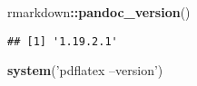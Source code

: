 \documentclass[]{article}
\newenvironment{Shaded}{\begin{snugshade}}{\end{snugshade}}
\newcommand{\KeywordTok}[1]{\textcolor[rgb]{0.13,0.29,0.53}{\textbf{#1}}}
\newcommand{\StringTok}[1]{\textcolor[rgb]{0.31,0.60,0.02}{#1}}
\newcommand{\OperatorTok}[1]{\textcolor[rgb]{0.81,0.36,0.00}{\textbf{#1}}}
\newcommand{\NormalTok}[1]{#1}
\begin{document}
\begin{Shaded}
\begin{Highlighting}[]
\NormalTok{rmarkdown}\OperatorTok{::}\KeywordTok{pandoc_version}\NormalTok{()}
\end{Highlighting}
\end{Shaded}

\begin{verbatim}
## [1] '1.19.2.1'
\end{verbatim}

\begin{Shaded}
\begin{Highlighting}[]
\KeywordTok{system}\NormalTok{(}\StringTok{'pdflatex --version'}\NormalTok{)}
\end{Highlighting}
\end{Shaded}
\end{document}
